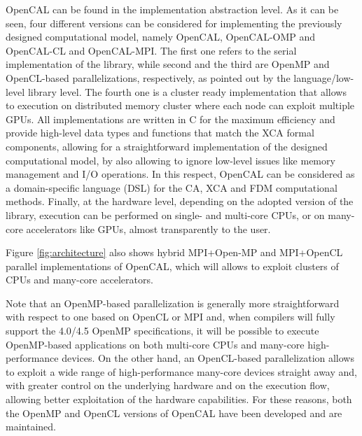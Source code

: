    OpenCAL can be found in the implementation abstraction level. As it
  can be seen, four different versions can be considered for
  implementing the previously designed computational model, namely
  OpenCAL, OpenCAL-OMP and OpenCAL-CL and OpenCAL-MPI. The first one refers to the   serial implementation of the library, while second and the third are OpenMP  and OpenCL-based parallelizations, respectively, as pointed out by
  the language/low-level library level. The fourth one is a cluster ready implementation that allows to execution on distributed memory cluster where each node can exploit multiple GPUs.
  All implementations are written in C for the maximum efficiency and provide high-level data types and functions that match the XCA formal components, allowing  for a straightforward implementation of the designed computational
  model, by also allowing to ignore low-level issues like memory
  management and I/O operations. In this respect, OpenCAL can be
  considered as a domain-specific language (DSL) for the CA, XCA and
  FDM computational methods. Finally, at the hardware level, depending
  on the adopted version of the library, execution can be performed on
  single- and multi-core CPUs, or on many-core accelerators like GPUs,
  almost transparently to the user.
  
   Figure \ref{fig:architecture} also shows hybrid MPI+Open-MP and
  MPI+OpenCL parallel implementations of OpenCAL, which will allows to
  exploit clusters of CPUs and many-core accelerators. 

  Note that an OpenMP-based parallelization is generally more
  straightforward with respect to one based on OpenCL or MPI and, when
  compilers will fully support the 4.0/4.5 OpenMP specifications, it
  will be possible to execute OpenMP-based applications on both
  multi-core CPUs and many-core high-performance devices. On the other
  hand, an OpenCL-based parallelization allows to exploit a wide range
  of high-performance many-core devices straight away and, with greater control on the underlying hardware and on the execution flow, allowing better exploitation of the hardware capabilities. 
 For these reasons, both the OpenMP and OpenCL versions of OpenCAL have been developed and are maintained. 
  
  
  